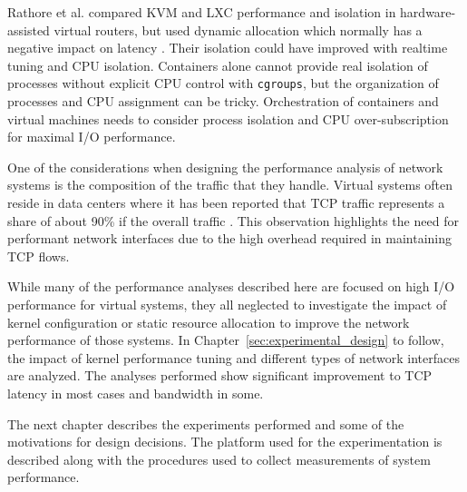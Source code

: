 Rathore et al. compared KVM and LXC performance and isolation in hardware-assisted virtual routers, but used dynamic allocation which normally has a negative impact on latency \autocite{rathore2013kvm}.
Their isolation could have improved with realtime tuning and CPU isolation.  
Containers alone cannot provide real isolation of processes without explicit CPU control with \texttt{cgroups}, but the organization of processes and CPU assignment can be tricky.
Orchestration of containers and virtual machines needs to consider process isolation and CPU over-subscription for maximal I/O performance.

One of the considerations when designing the performance analysis of network systems is the composition of the traffic that they handle.  
Virtual systems often reside in data centers where it has been reported that TCP traffic represents a share of about 90\% if the overall traffic \autocite{haTCPCloud2013}.
This observation highlights the need for performant network interfaces due to the high overhead required in maintaining TCP flows.

While many of the performance analyses described here are focused on high I/O performance for virtual systems, they all neglected to investigate the impact of kernel configuration or static resource allocation to improve the network performance of those systems.  
In Chapter~\ref{sec:experimental_design} to follow, the impact of kernel performance tuning and different types of network interfaces are analyzed.  
The analyses performed show significant improvement to TCP latency in most cases and bandwidth in some.

The next chapter describes the experiments performed and some of the motivations for design decisions. 
The platform used for the experimentation is described along with the procedures used to collect measurements of system performance.


\nocite{_dpdk_1, _adams_1, _chowdhury_1, seo2014performance, gomes2014performance, kivity2014osv, wang2011understanding}

